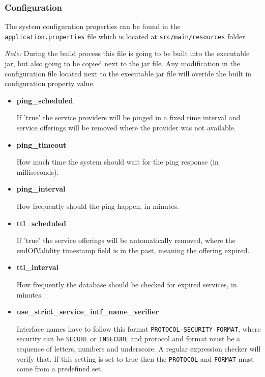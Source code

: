 \documentclass[a4paper]{arrowhead}
\begin{document}
\clearpage

\subsubsection{Configuration}
The system configuration properties can be found in the \texttt{application.properties} file which is located at \texttt{src/main/resources} folder.

\textit{Note:} During the build process this file is going to be built into the executable jar, but also going to be copied next to the jar file. Any modification in the configuration file located next to the executable jar file will overide the built in configuration property value.

\begin{itemize}
    \item \textbf{ping\_scheduled}
  
    If 'true' the service providers will be pinged in a fixed time interval and service offerings will be removed where the provider was not available.
    
    \item \textbf{ping\_timeout}
  
    How much time the system should wait for the ping response (in milliseconds).
    
    \item \textbf{ping\_interval}
  
    How frequently should the ping happen, in minutes.
    
    \item \textbf{ttl\_scheduled}
  
    If 'true' the service offerings will be automatically removed, where the endOfValidity timestamp field is in the past, meaning the offering expired.
    
    \item \textbf{ttl\_interval}
  
    How frequently the database should be checked for expired services, in minutes.
    
    \item \textbf{use\_strict\_service\_intf\_name\_verifier}
  
    Interface names have to follow this format \texttt{PROTOCOL-SECURITY-FORMAT}, where security can be \texttt{SECURE} or \texttt{INSECURE} and protocol and format must be a sequence of letters, numbers and underscore. A regular expression checker will verify that. If this setting is set to true then the \texttt{PROTOCOL} and \texttt{FORMAT} must come from a predefined set.
    

\end{itemize}
\end{document}
